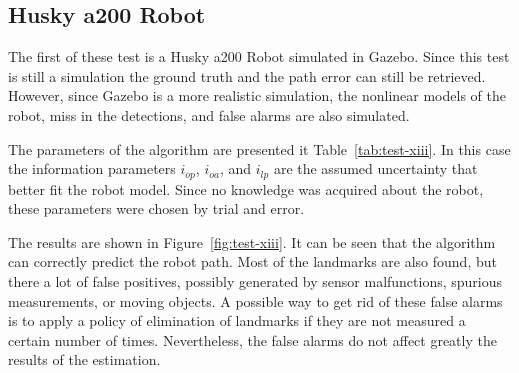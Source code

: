 \subsection{Husky a200 Robot}

The first of these test is a Husky a200 Robot simulated in Gazebo. Since this test is still a simulation the ground truth and the path error can still be retrieved. However, since Gazebo is a more realistic simulation, the nonlinear models of the robot, miss in the detections, and false alarms are also simulated. 

The parameters of the algorithm are presented it Table~\ref{tab:test-xiii}. In this case the information parameters $i_{op}$, $i_{oa}$, and $i_{lp}$ are the assumed uncertainty that better fit the robot model. Since no knowledge was acquired about the robot, these parameters were chosen by trial and error. 

The results are shown in Figure~\ref{fig:test-xiii}. It can be seen that the algorithm can correctly predict the robot path. Most of the landmarks are also found, but there a lot of false positives, possibly generated by sensor malfunctions, spurious measurements, or moving objects. A possible way to get rid of these false alarms is to apply a policy of elimination of landmarks if they are not measured a certain number of times. Nevertheless, the false alarms do not affect greatly the results of the estimation.

